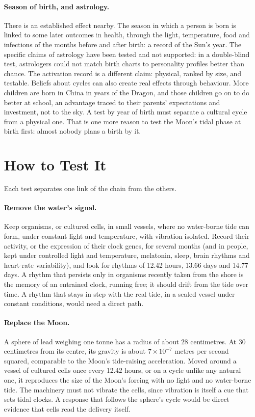 \documentclass[11pt,a4paper]{article}
\begin{document}
\paragraph{Season of birth, and astrology.} There is an established effect nearby. The season in which a person is born is linked to some later outcomes in health, through the light, temperature, food and infections of the months before and after birth: a record of the Sun's year. The specific claims of astrology have been tested and not supported: in a double-blind test, astrologers could not match birth charts to personality profiles better than chance. The activation record is a different claim: physical, ranked by size, and testable. Beliefs about cycles can also create real effects through behaviour. More children are born in China in years of the Dragon, and those children go on to do better at school, an advantage traced to their parents' expectations and investment, not to the sky. A test by year of birth must separate a cultural cycle from a physical one. That is one more reason to test the Moon's tidal phase at birth first: almost nobody plans a birth by it.

\section{How to Test It}
\label{sec:tests}

Each test separates one link of the chain from the others.

\paragraph{Remove the water's signal.} Keep organisms, or cultured cells, in small vessels, where no water-borne tide can form, under constant light and temperature, with vibration isolated. Record their activity, or the expression of their clock genes, for several months (and in people, kept under controlled light and temperature, melatonin, sleep, brain rhythms and heart-rate variability), and look for rhythms of 12.42 hours, 13.66 days and 14.77 days. A rhythm that persists only in organisms recently taken from the shore is the memory of an entrained clock, running free; it should drift from the tide over time. A rhythm that stays in step with the real tide, in a sealed vessel under constant conditions, would need a direct path.

\paragraph{Replace the Moon.} A sphere of lead weighing one tonne has a radius of about 28 centimetres. At 30 centimetres from its centre, its gravity is about $7\times10^{-7}$ metres per second squared, comparable to the Moon's tide-raising acceleration. Moved around a vessel of cultured cells once every 12.42 hours, or on a cycle unlike any natural one, it reproduces the size of the Moon's forcing with no light and no water-borne tide. The machinery must not vibrate the cells, since vibration is itself a cue that sets tidal clocks. A response that follows the sphere's cycle would be direct evidence that cells read the delivery itself.
\end{document}
